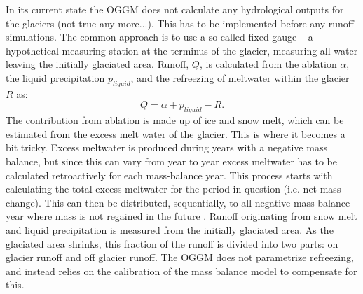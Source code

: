 \documentclass[12pt, a4paper]{article}
\begin{document}
In its current state the OGGM does not calculate any hydrological outputs for
the glaciers (not true any more...). This has to be implemented before any
runoff simulations. The common approach is to use a so called fixed gauge -- a
hypothetical measuring station at the terminus of the glacier, measuring all
water leaving the initially glaciated area. Runoff, $Q$, is calculated from the
ablation $\alpha$, the liquid precipitation $p_{liquid}$, and the refreezing
of meltwater within the glacier $R$ as:
\begin{equation}
    Q = \alpha + p_{liquid} - R.
\end{equation}
The contribution from ablation is made up of ice and snow melt, which can be
estimated from the excess melt water of the glacier. This is where it becomes a
bit tricky. Excess meltwater is produced during years with a negative mass
balance, but since this can vary from year to year excess meltwater has to be
calculated retroactively for each mass-balance year. This process starts with
calculating the total excess meltwater for the period in question (i.e. net mass
change). This can then be distributed, sequentially, to all negative
mass-balance year where mass is not regained in the future
\parencite{rounceGlacierMassChange2020}. Runoff originating from snow melt and
liquid precipitation is measured from the initially glaciated area. As the
glaciated area shrinks, this fraction of the runoff is divided into two parts:
on glacier runoff and off glacier runoff. The OGGM does not parametrize
refreezing, and instead relies on the calibration of the mass balance model to
compensate for this.
\end{document}
